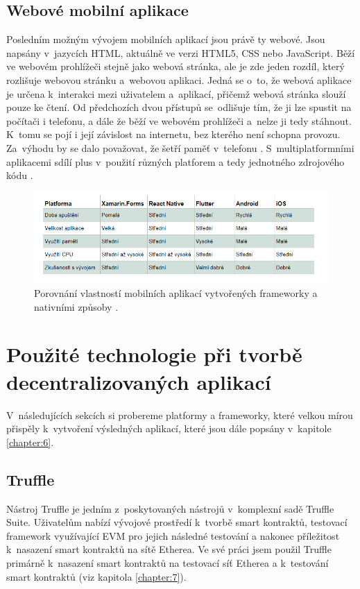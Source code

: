 \section{Webové mobilní aplikace}
Posledním možným vývojem mobilních aplikací jsou právě ty webové. Jsou napsány v~jazycích HTML, aktuálně ve verzi HTML5, CSS nebo JavaScript. Běží ve webovém prohlížeči stejně jako webová stránka, ale je zde jeden rozdíl, který rozlišuje webovou stránku a~webovou aplikaci. Jedná se o~to, že webová aplikace je určena k~interakci mezi uživatelem a~aplikací, přičemž webová stránka slouží pouze ke čtení. Od předchozích dvou přístupů se~odlišuje tím, že ji lze spustit na počítači i telefonu, a dále že běží ve webovém prohlížeči a~nelze ji tedy stáhnout. K~tomu se pojí i její závislost na internetu, bez kterého není schopna provozu. Za~výhodu by se dalo považovat, že šetří paměť v~telefonu \cite{web1}. S~multiplatformními aplikacemi sdílí plus v~použití různých platforem a tedy jednotného zdrojového kódu \cite{web2}.

\begin{figure}
\centering
\includegraphics[width=\textwidth]{obrazky/porovnani.png}
\caption{Porovnání vlastností mobilních aplikací vytvořených frameworky a nativními způsoby \cite{AppsFrameworks}.}
\label{fig:frameworks}
\end{figure}

\chapter{Použité technologie při tvorbě decentralizovaných aplikací}
\label{chapter:4}
V~následujících sekcích si probereme platformy a frameworky, které velkou mírou přispěly k~vytvoření výsledných aplikací, které jsou dále popsány v~kapitole \ref{chapter:6}.

\section{Truffle}
Nástroj Truffle je jedním z~poskytovaných nástrojů v~komplexní sadě Truffle Suite. Uživatelům nabízí vývojové prostředí k~tvorbě smart kontraktů, testovací framework využívající EVM pro jejich následné testování a nakonec příležitost k~nasazení smart kontraktů na sítě Etherea. Ve své práci jsem použil Truffle primárně k~nasazení smart kontraktů na testovací síť Etherea a k~testování smart kontraktů (viz kapitola \ref{chapter:7}). 

